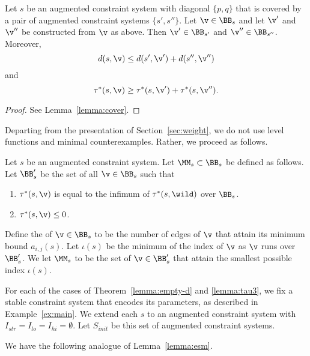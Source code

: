 \begin{lemma}\label{lemma:cover2}
Let $s$ be an augmented constraint system with diagonal $\{p,q\}$ that is covered
by a pair of augmented constraint systems $\{s',s''\}$. 
Let $\v\in \BB_s$ and let $\v'$ and $\v''$ be constructed from $\v$ as above.
Then  $\v'\in \BB_{s'}$ and $\v''\in \BB_{s''}$.
Moreover,
\begin{equation}
d(s,\v) \le d(s',\v') + d(s'',\v'')
\end{equation}
and
\begin{equation}
\tau^*(s,\v)\ge \tau^*(s,\v')+\tau^*(s,\v'').
\end{equation}
\end{lemma}

\begin{proof} See Lemma~\ref{lemma:cover}.
\end{proof}

Departing from the presentation of Section~\ref{sec:weight}, we do not
use level functions and minimal counterexamples.  Rather, we proceed
as follows.


\begin{definition} 
Let $s$ be an augmented constraint system.
Let $\MM_{s}\subset \BB_{s}$ be defined as follows.
Let $\BB'_{s}$ be the set of all $\v\in \BB_{s}$ such that
\begin{enumerate}
\item $\tau^*(s,\v)$ is equal to the infimum of $\tau^*(s,\wild)$ over $\BB_{s}$.
\item $\tau^*(s,\v)\le 0$.
\end{enumerate}
Define the  of $\v\in \BB_s$ to be the number of edges of $\v$
that attain its minimum bound $a_{i,j}(s)$.  Let $\iota(s)$ be the minimum
of the index of $\v$ as $\v$ runs over $\BB'_s$.  
We let $\MM_{s}$ to be the set of $\v\in \BB'_{s}$ that attain
the smallest possible index $\iota(s)$.
\end{definition}

\begin{definition}[$S_{init}$] 
For each of the cases of Theorem~\ref{lemma:empty-d} and \ref{lemma:tau3}, we fix a
stable constraint system that encodes its parameters, as described in Example~\ref{ex:main}. 
We extend each $s$ to an augmented constraint system with $I_{str}=I_{lo}=I_{hi}=\emptyset$.
Let $S_{init}$ be this set of  augmented constraint systems.
\end{definition}

We have the following analogue of Lemma~\ref{lemma:esm}.

